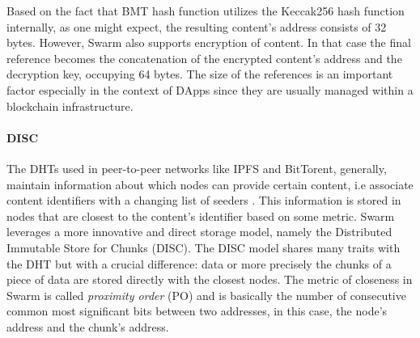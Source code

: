 Based on the fact that BMT hash function utilizes the Keccak256 hash function internally, as one might expect, the resulting content's address consists of 32 bytes. However, Swarm also supports encryption of content. In that case the final reference becomes the concatenation of the encrypted content's address and the decryption key, occupying 64 bytes. The size of the references is an important factor especially in the context of DApps since they are usually managed within a blockchain infrastructure.

\paragraph{DISC}\label{par:disc}
The DHTs used in peer-to-peer networks like IPFS and BitTorent, generally, maintain information about which nodes can provide certain content, i.e associate content identifiers with a changing list of seeders \citep{crosby_2007, jimenez_2009}. This information is stored in nodes that are closest to the content's identifier based on some metric. Swarm leverages a more innovative and direct storage model, namely the Distributed Immutable Store for Chunks (DISC). The DISC model shares many traits with the DHT but with a crucial difference: data or more precisely the chunks of a piece of data are stored directly with the closest nodes. The metric of closeness in Swarm is called \textit{proximity order} (PO) and is basically the number of consecutive common most significant bits between two addresses, in this case, the node's address and the chunk's address. 


